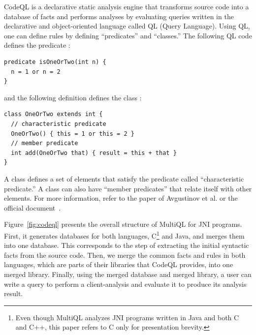 CodeQL is a declarative static analysis engine that transforms source code into
a database of facts and performs analyses by evaluating queries written in the
declarative and object-oriented language called QL (Query Language). Using QL,
one can define rules by defining ``predicates'' and ``classes.'' The following
QL code defines the predicate :

\begin{lstlisting}[style=codeql,xleftmargin=2.5em]
predicate isOneOrTwo(int n) {
  n = 1 or n = 2
}
\end{lstlisting}

\noindent
and the following definition defines the class :

\begin{lstlisting}[style=codeql,xleftmargin=2.5em]
class OneOrTwo extends int {
  // characteristic predicate
  OneOrTwo() { this = 1 or this = 2 }
  // member predicate
  int add(OneOrTwo that) { result = this + that }
}
\end{lstlisting}

\noindent
A class defines a set of elements that satisfy the predicate called
``characteristic predicate.'' A class can also have ``member predicates''
that relate itself with other elements. For more information, refer to
the paper of Avgustinov et al.\cite{ql2016} or the official document~\cite{codeql}.


Figure~\ref{fig:codeql} presents the overall structure of MultiQL for JNI
programs.  First, it generates databases for both languages, C\footnote{ Even
though MultiQL analyzes JNI programs written in Java and both C and C++, this
paper refers to C only for presentation brevity.} and Java, and merges them into
one database.  This corresponds to the step of extracting the initial syntactic
facts from the source code.  Then, we merge the common facts and rules in both
languages, which are parts of their libraries that CodeQL provides, into one
merged library.  Finally, using the merged database and merged library, a user
can write a query to perform a client-analysis and evaluate it to produce its
analysis result.

